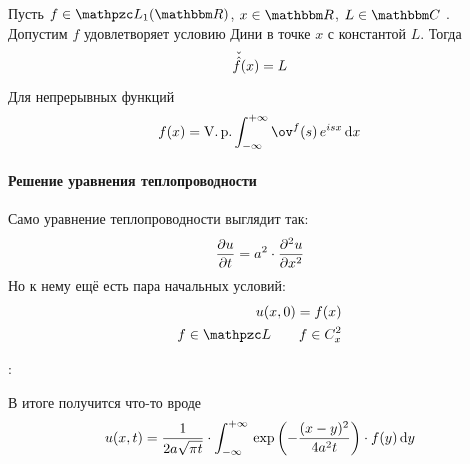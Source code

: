 \documentclass[12pt,draft,timbord]{longnotes}
\begin{document}
\begin{thrm}\label{thrm:fourier::transform::recov}
  Пусть $f\in \summb_1(\R)$, $x\in \R$, $L\in \C$ .
  Допустим $f$ удовлетворяет условию Дини в точке $x$ с константой $L$. Тогда
  \[
    \check{\vphantom{\sum}\hat{f}} (x) = L
  \]
  Для непрерывных функций \[
    f(x) = \Vp \intR \ov^f(s) \, e^{isx} \, \del x
  \]
\end{thrm}

\paragraph{Решение уравнения теплопроводности}
\label{par:fourier::heat}

Само уравнение теплопроводности выглядит так:
\[
  \frac{\partial u}{\partial t} = a^2 \cdot \frac{\partial^2 u}{\partial x^2} 
\]
Но к нему ещё есть пара начальных условий:
\begin{align*}
  u(x,0) = f(x) \\
  f \in \summb \qquad f \in C^2_x
\end{align*}

\underdev: 

В итоге получится что-то вроде\[
  u(x,t) = \frac{1}{2a\sqrt{\pi t}}  \cdot \int_{-\infty}^{+\infty} \, \exp \left(-\frac{(x-y)^2}{4a^2 t}\right)\cdot f(y) \, \mathrm{d} y 
\]
\end{document}
